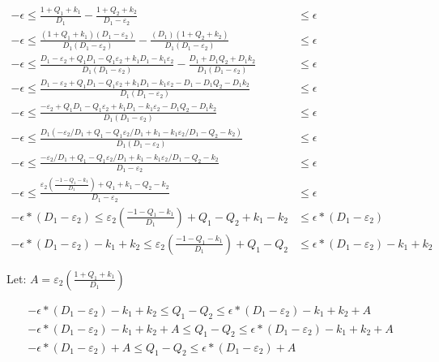 \documentclass[11pt]{amsart}
\begin{document}
\encircle{-}
\begin{align*}
- \epsilon \leq \frac{1 + Q_1 + k_1}{D_1} - \frac{1 + Q_2 + k_2}{D_1 - \varepsilon_2} &\leq \epsilon \\
- \epsilon \leq \frac{(1 + Q_1 + k_1)(D_1 - \varepsilon_2)}{D_1(D_1 - \varepsilon_2)} - \frac{(D_1)(1 + Q_2 + k_2)}{D_1(D_1 - \varepsilon_2)} &\leq \epsilon \\
- \epsilon \leq \frac{D_1 - \varepsilon_2 + Q_1D_1 - Q_1\varepsilon_2 + k_1D_1 - k_1\varepsilon_2}{D_1(D_1 - \varepsilon_2)} - \frac{D_1 + D_1Q_2 + D_1k_2}{D_1(D_1 - \varepsilon_2)} &\leq \epsilon \\
- \epsilon \leq \frac{D_1 - \varepsilon_2 + Q_1D_1 - Q_1\varepsilon_2 + k_1D_1 - k_1\varepsilon_2 - D_1 - D_1Q_2 - D_1k_2}{D_1(D_1 - \varepsilon_2)} &\leq \epsilon \\
- \epsilon \leq \frac{- \varepsilon_2 + Q_1D_1 - Q_1\varepsilon_2 + k_1D_1 - k_1\varepsilon_2 - D_1Q_2 - D_1k_2}{D_1(D_1 - \varepsilon_2)} &\leq \epsilon \\
- \epsilon \leq \frac{D_1 ( -\varepsilon_2/D_1 + Q_1 - Q_1\varepsilon_2/D_1 + k_1 - k_1\varepsilon_2/D_1 - Q_2 - k_2)}{D_1(D_1 - \varepsilon_2)} &\leq \epsilon \\
- \epsilon \leq \frac{-\varepsilon_2/D_1 + Q_1 - Q_1\varepsilon_2/D_1 + k_1 - k_1\varepsilon_2/D_1 - Q_2 - k_2}{D_1 - \varepsilon_2} &\leq \epsilon \\
- \epsilon \leq \frac{\varepsilon_2(\frac{-1 - Q_1 - k_1}{D_1}) + Q_1 + k_1 - Q_2 - k_2}{D_1 - \varepsilon_2} &\leq \epsilon \\
- \epsilon*(D_1 - \varepsilon_2) \leq \varepsilon_2(\frac{-1 - Q_1 - k_1}{D_1}) + Q_1 - Q_2 + k_1 - k_2 &\leq \epsilon*(D_1 - \varepsilon_2) \\
- \epsilon*(D_1 - \varepsilon_2) - k_1 + k_2  \leq \varepsilon_2(\frac{-1 - Q_1 - k_1}{D_1}) + Q_1 - Q_2 &\leq \epsilon*(D_1 - \varepsilon_2) - k_1 + k_2
\end{align*}

Let: $A = \varepsilon_2(\frac{1 + Q_1 + k_1}{D_1})$

\begin{align*}
- \epsilon*(D_1 - \varepsilon_2) - k_1 + k_2  \leq Q_1 - Q_2 \leq \epsilon*(D_1 - \varepsilon_2) - k_1 + k_2 + A \\
- \epsilon*(D_1 - \varepsilon_2) - k_1 + k_2 + A  \leq Q_1 - Q_2 \leq \epsilon*(D_1 - \varepsilon_2) - k_1 + k_2 + A \\
- \epsilon*(D_1 - \varepsilon_2) + A  \leq Q_1 - Q_2 \leq \epsilon*(D_1 - \varepsilon_2) + A
\end{align*}
\end{document}
